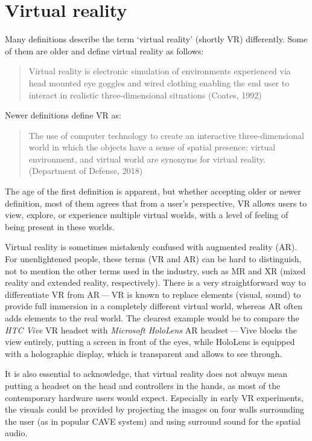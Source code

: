 \chapter{Virtual reality}

Many definitions describe the term `virtual reality' (shortly VR) differently.
Some of them are older and define virtual reality as follows:

\begin{quotation}
Virtual reality is electronic simulation of environments experienced via
head mounted eye goggles and wired clothing enabling the end user to interact
in realistic three-dimensional situations (Coates, 1992)
\end{quotation}

Newer definitions define VR as:

\begin{quotation}
The use of computer technology to create an interactive three-dimensional
world in which the objects have a sense of spatial presence;
virtual environment, and virtual world are synonyms for virtual reality.
(Department of Defense, 2018)
\end{quotation}

The age of the first definition is apparent, but whether accepting older or newer
definition, most of them agrees that from a user's perspective, VR allows
users to view, explore, or experience multiple virtual worlds, with a level of 
feeling of being present in these worlds.

Virtual reality is sometimes mistakenly confused with augmented reality (AR).
For unenlightened people, these terms (VR and AR) can be hard to distinguish,
not to mention the other terms used in the industry, such as MR and XR
(mixed reality and extended reality, respectively). There is a very straightforward
way to differentiate VR from AR — VR is known to replace elements
(visual, sound) to provide full immersion in a completely different virtual
world, whereas AR often adds elements to the real world\cite{vrar}.
The clearest example would be to compare the \emph{HTC Vive} VR headset with
\emph{Microsoft HoloLens} AR headset — Vive blocks the view entirely, putting
a screen in front of the eyes, while HoloLens is equipped with a holographic
display, which is transparent and allows to see through.

It is also essential to acknowledge, that virtual reality does not always mean
putting a headset on the head and controllers in the hands, as most of the
contemporary hardware users would expect. Especially in
early VR experiments, the visuals could be provided by projecting the images
on four walls surrounding the user (as in popular CAVE system\cite{cave}) and
using surround sound for the spatial audio.

